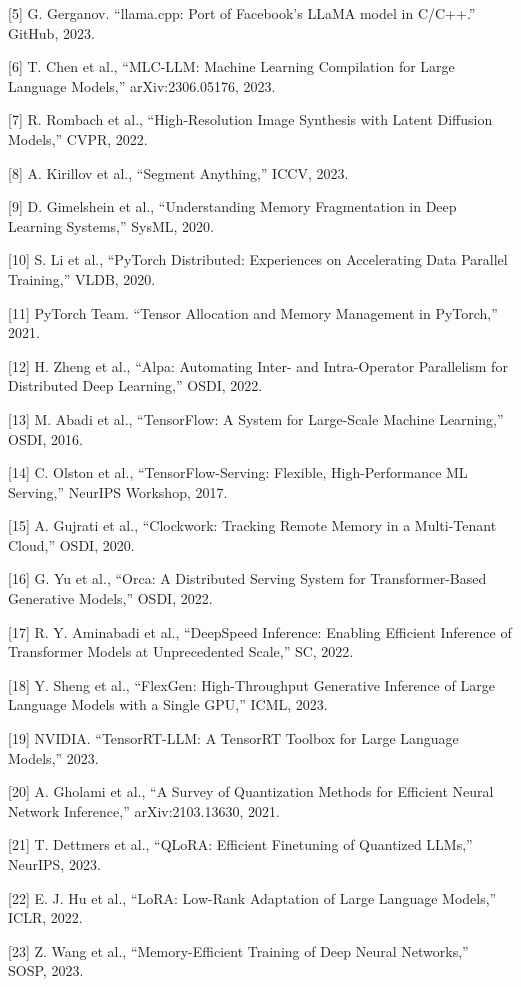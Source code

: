 \documentclass[conference]{IEEEtran}
\begin{document}
[5] G. Gerganov. ``llama.cpp: Port of Facebook's LLaMA model in C/C++.'' GitHub, 2023.

[6] T. Chen et al., ``MLC-LLM: Machine Learning Compilation for Large Language Models,'' arXiv:2306.05176, 2023.

[7] R. Rombach et al., ``High-Resolution Image Synthesis with Latent Diffusion Models,'' CVPR, 2022.

[8] A. Kirillov et al., ``Segment Anything,'' ICCV, 2023.

[9] D. Gimelshein et al., ``Understanding Memory Fragmentation in Deep Learning Systems,'' SysML, 2020.

[10] S. Li et al., ``PyTorch Distributed: Experiences on Accelerating Data Parallel Training,'' VLDB, 2020.

[11] PyTorch Team. ``Tensor Allocation and Memory Management in PyTorch,'' 2021.

[12] H. Zheng et al., ``Alpa: Automating Inter- and Intra-Operator Parallelism for Distributed Deep Learning,'' OSDI, 2022.

[13] M. Abadi et al., ``TensorFlow: A System for Large-Scale Machine Learning,'' OSDI, 2016.

[14] C. Olston et al., ``TensorFlow-Serving: Flexible, High-Performance ML Serving,'' NeurIPS Workshop, 2017.

[15] A. Gujrati et al., ``Clockwork: Tracking Remote Memory in a Multi-Tenant Cloud,'' OSDI, 2020.

[16] G. Yu et al., ``Orca: A Distributed Serving System for Transformer-Based Generative Models,'' OSDI, 2022.

[17] R. Y. Aminabadi et al., ``DeepSpeed Inference: Enabling Efficient Inference of Transformer Models at Unprecedented Scale,'' SC, 2022.

[18] Y. Sheng et al., ``FlexGen: High-Throughput Generative Inference of Large Language Models with a Single GPU,'' ICML, 2023.

[19] NVIDIA. ``TensorRT-LLM: A TensorRT Toolbox for Large Language Models,'' 2023.

[20] A. Gholami et al., ``A Survey of Quantization Methods for Efficient Neural Network Inference,'' arXiv:2103.13630, 2021.

[21] T. Dettmers et al., ``QLoRA: Efficient Finetuning of Quantized LLMs,'' NeurIPS, 2023.

[22] E. J. Hu et al., ``LoRA: Low-Rank Adaptation of Large Language Models,'' ICLR, 2022.

[23] Z. Wang et al., ``Memory-Efficient Training of Deep Neural Networks,'' SOSP, 2023.
\end{document}
